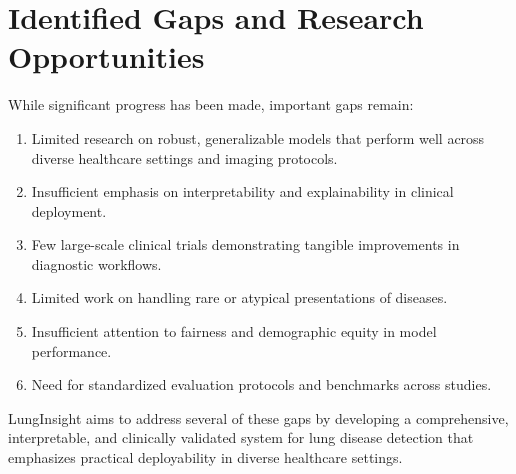 {\section{Identified Gaps and Research Opportunities}

While significant progress has been made, important gaps remain:

\begin{enumerate}
    \item Limited research on robust, generalizable models that perform well across diverse healthcare settings and imaging protocols.
    \item Insufficient emphasis on interpretability and explainability in clinical deployment.
    \item Few large-scale clinical trials demonstrating tangible improvements in diagnostic workflows.
    \item Limited work on handling rare or atypical presentations of diseases.
    \item Insufficient attention to fairness and demographic equity in model performance.
    \item Need for standardized evaluation protocols and benchmarks across studies.
\end{enumerate}

LungInsight aims to address several of these gaps by developing a comprehensive, interpretable, and clinically validated system for lung disease detection that emphasizes practical deployability in diverse healthcare settings.

}
